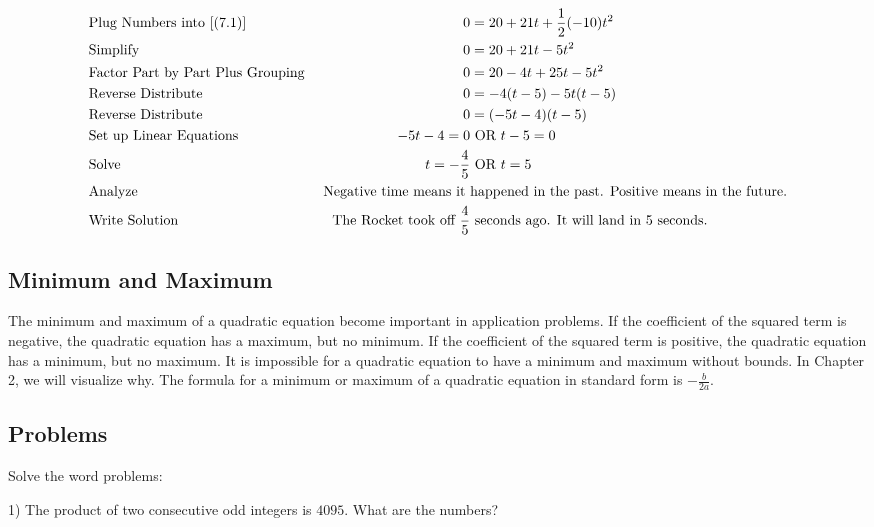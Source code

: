 \documentclass{book}
\theoremstyle{definition}
\begin{document}
\label{(7.3)}
\begin{align*}
&\text{Plug Numbers into \ref{(7.1)}}  &0&=20+21t+\frac{1}{2}(-10)t^2 \\
&\text{Simplify}
&0&=20+21t-5t^2 \\
&\text{Factor Part by Part Plus Grouping }  &0&=20-4t+25t-5t^2 \\
&\text{Reverse Distribute }
&0&=-4(t-5)-5t(t-5) \\
&\text{Reverse Distribute }
&0&=(-5t-4)(t-5) \\
&\text{Set up Linear Equations} &-5t-4=0 &\text{ OR } t-5=0 \\
&\text{Solve} & t=-\frac{4}{5} &\text{ OR }t=5 \\
&\text{Analyze} &\text{Negative time means it }&\text{happened in the past. Positive means in the future.} \\
&\text{Write Solution} & \text{The Rocket took off } \frac{4}{5}&\text{ seconds ago. It will land in 5 seconds.}
\end{align*}

\subsection{Minimum and Maximum}

The minimum and maximum of a quadratic equation become important in application problems. If the coefficient of the squared term is negative, the quadratic equation has a maximum, but no minimum. If the coefficient of the squared term is positive, the quadratic equation has a minimum, but no maximum. It is impossible for a quadratic equation to have a minimum and maximum without bounds. In Chapter 2, we will visualize why. The formula for a minimum or maximum of a quadratic equation in standard form is $-\frac{b}{2a}$.

\subsection{Problems}

\vspace{3mm}

Solve the word problems:

\vspace{3mm}

1) The product of two consecutive odd integers is $4095$. What are the numbers?
\end{document}
